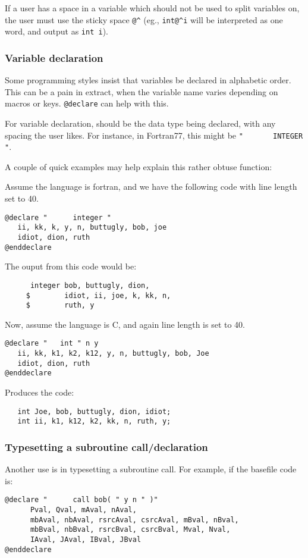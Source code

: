If a user has a space in a variable which should not be used to split
variables on,
the user must use the sticky space \verb+@^+ (eg., \verb+int@^i+ will be
interpreted as one word, and output as {\tt int i}).

\subsubsection{Variable declaration}
\noindent

Some programming styles insist that variables be declared in alphabetic
order.  This can be a pain in extract, when the variable name varies 
depending on macros or keys.  {\tt @declare} can help with this.

For variable declaration, {\tt <start string>} should be the data type
being declared, with any spacing the user likes.  For instance, in Fortran77,
this might be 
\verb+"       INTEGER "+.  

A couple of quick examples may help explain this rather obtuse function:

Assume the language is fortran, and we have the following code with
line length set to 40.
\begin{verbatim}
@declare "      integer "
   ii, kk, k, y, n, buttugly, bob, joe
   idiot, dion, ruth
@enddeclare
\end{verbatim}
The ouput from this code would be:
\begin{verbatim}
      integer bob, buttugly, dion,
     $        idiot, ii, joe, k, kk, n,
     $        ruth, y
\end{verbatim}

\noindent
Now, assume the language is C, and again line length is set to 40.
\begin{verbatim}
@declare "   int " n y
   ii, kk, k1, k2, k12, y, n, buttugly, bob, Joe
   idiot, dion, ruth
@enddeclare
\end{verbatim}

\noindent
Produces the code:
\begin{verbatim}
   int Joe, bob, buttugly, dion, idiot;
   int ii, k1, k12, k2, kk, n, ruth, y;
\end{verbatim}

\subsubsection{Typesetting a subroutine call/declaration}
Another use is in typesetting a subroutine call.  For example, if the basefile
code is:
\begin{verbatim}
@declare "      call bob( " y n " )"
      Pval, Qval, mAval, nAval,
      mbAval, nbAval, rsrcAval, csrcAval, mBval, nBval,         
      mbBval, nbBval, rsrcBval, csrcBval, Mval, Nval,           
      IAval, JAval, IBval, JBval
@enddeclare
\end{verbatim}

